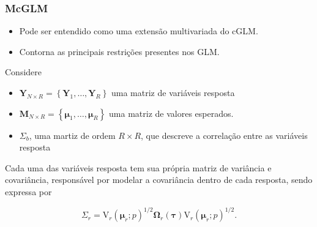 \documentclass[handout,serif, professionalfont, usenames, dvipsnames, aspectratio = 169]{beamer}\usepackage[]{graphicx}\usepackage[]{color}
\begin{document}

\begin{frame}
  \frametitle{McGLM}
  \begin{itemize}
    \itemsep 2ex
  
  \item Pode ser entendido como uma extensão multivariada do cGLM. 
  
  \item Contorna as principais restrições presentes nos GLM. 

  \end{itemize}
  
  Considere
  
  \begin{itemize}
  \item $\boldsymbol{Y}_{N \times R} = \left \{ \boldsymbol{Y}_1, \dots, \boldsymbol{Y}_R \right \}$ uma matriz de variáveis resposta
  
  \item $\boldsymbol{M}_{N \times R} = \left \{ \boldsymbol{\mu}_1, \dots, \boldsymbol{\mu}_R \right \}$ uma matriz de valores esperados.
  
  \item $\Sigma_b$, uma martiz de ordem $R \times R$, que descreve a correlação entre as variáveis resposta
  
\end{itemize}

  Cada uma das variáveis resposta tem sua própria matriz de variância e covariância, responsável por modelar a covariância dentro de cada resposta, sendo expressa por

\begin{equation}
\Sigma_r =
\mathrm{V}_r\left(\boldsymbol{\mu}_r; p\right)^{1/2}\boldsymbol{\Omega}_r\left(\boldsymbol{\tau}\right)\mathrm{V}_r\left(\boldsymbol{\mu}_r; p\right)^{1/2}.
\end{equation}
  
\end{frame}

\end{document}

